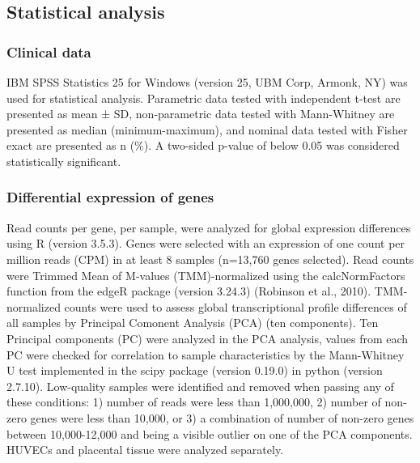 \documentclass[authordate, empirical,issue]{jote-new-article}
\begin{document}
\subsection{Statistical analysis}



\subsubsection{Clinical data}



IBM SPSS Statistics 25 for Windows (version 25, UBM Corp, Armonk, NY) was used for statistical analysis. Parametric data tested with independent t-test are presented as mean ± SD, non-parametric data tested with Mann-Whitney are presented as median (minimum-maximum), and nominal data tested with Fisher exact are presented as n (\%). A two-sided p-value of below 0.05 was considered statistically significant.


\subsubsection{Differential expression of genes}



Read counts per gene, per sample, were analyzed for global expression differences using R (version 3.5.3). Genes were selected with an expression of one count per million reads (CPM) in at least 8 samples (n=13,760 genes selected). Read counts were Trimmed Mean of M-values (TMM)-normalized using the calcNormFactors function from the edgeR package (version 3.24.3) (Robinson et al., 2010). TMM-normalized counts were used to assess global transcriptional profile differences of all samples by Principal Comonent Analysis (PCA) (ten components). Ten Principal components (PC) were analyzed in the PCA analysis, values from each PC were checked for correlation to sample characteristics by the Mann-Whitney U test implemented in the scipy package (version 0.19.0) in python (version 2.7.10). Low-quality samples were identified and removed when passing any of these conditions: 1) number of reads were less than 1,000,000, 2) number of non-zero genes were less than 10,000, or 3) a combination of number of non-zero genes between 10,000-12,000 and being a visible outlier on one of the PCA components. HUVECs and placental tissue were analyzed separately.
\end{document}
